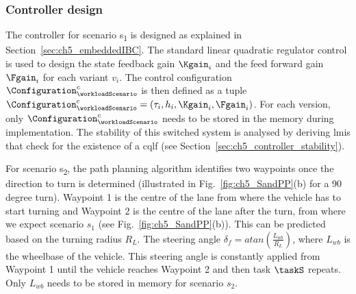 \subsubsection{Controller design}\label{sec:ch5_control_Design_stability}
The controller for scenario s\textsubscript{1} is designed as explained in Section~\ref{sec:ch5_embeddedIBC}. 
The standard linear quadratic regulator control is used to design the state feedback gain $\Kgain_{i}$ and the feed forward gain $\Fgain_{i}$ for each variant $v_i$. 
The control configuration $\Configuration_{\workloadScenario}^c$ is then defined as a tuple $\Configuration_{\workloadScenario}^c = (\tau_{i}, h_{i}, \Kgain_{i}, \Fgain_{i})$. For each version, only $\Configuration_{\workloadScenario}^c$ needs to be stored in the memory during implementation. 
The stability of this switched system is analysed by deriving \glspl{lmi} that check for the existence of a \gls{cqlf} (see Section~\ref{sec:ch5_controller_stability}).

For scenario s\textsubscript{2}, the path planning algorithm identifies two waypoints once the direction to turn is determined (illustrated in Fig.~\ref{fig:ch5_SandPP}(b) for a 90 degree turn). Waypoint 1 is the centre of the lane from where the vehicle has to start turning and Waypoint 2 is the centre of the lane after the turn, from where we expect scenario $s_1$ (see Fig.~\ref{fig:ch5_SandPP}(b)). This can be predicted based on the turning radius $R_L$. The steering angle $\delta_f=atan\left(\frac{L_{wb}}{R_L}\right)$, where $L_{wb}$ is the wheelbase of the vehicle. This steering angle is constantly applied from Waypoint 1 until the vehicle reaches Waypoint 2 and then task $\taskS$ repeats. Only $L_{wb}$ needs to be stored in memory for scenario $s_2$.

